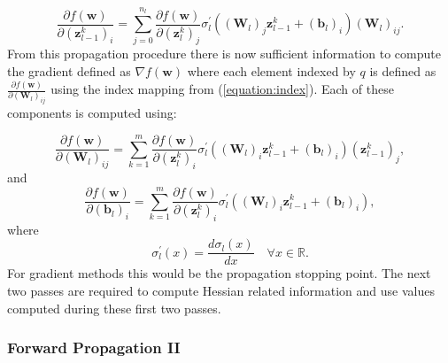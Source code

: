 \documentclass[letterpaper,12pt,titlepage,oneside,final]{book}
\begin{document}
	\begin{equation}
	\frac{\partial{f(\mathbf{w})}}{\partial{(\mathbf{z}_{l-1}^{k})_{i}}} = \sum_{j=0}^{n_{l}}{\frac{\partial{f(\mathbf{w})}}{\partial{(\mathbf{z}_{l}^{k})_{j}}}\sigma_{l}^{\prime}((\mathbf{W}_{l})_{j}\mathbf{z}_{l-1}^{k} + (\mathbf{b}_{l})_{i})(\mathbf{W}_{l})_{ij}}.
	\label{equation:pass2_pe}
	\end{equation}
	From this propagation procedure there is now sufficient information to compute the gradient defined as $\nabla{f(\mathbf{w})}$ where each element indexed by $q$ is defined as $\frac{\partial{f(\mathbf{w})}}{\partial{(\mathbf{W}_{l})_{ij}}}$ using the index mapping from (\ref{equation:index}). Each of these components is computed using:
	
	\begin{equation}
	\frac{\partial{f(\mathbf{w})}}{\partial{(\mathbf{W}_{l})_{ij}}} = \sum_{k=1}^{m}{\frac{\partial{f(\mathbf{w})}}{\partial{(\mathbf{z}_{l}^{k})_{i}}}\sigma_{l}^{\prime}((\mathbf{W}_{l})_{i}\mathbf{z}_{l-1}^{k}+ (\mathbf{b}_{l})_{i})(\mathbf{z}^{k}_{l-1})_{j}},
	\label{equation:grad_w}
	\end{equation}
	and
	\begin{equation}
	\frac{\partial{f(\mathbf{w})}}{\partial{(\mathbf{b}_{l})_{i}}} = \sum_{k=1}^{m}{\frac{\partial{f(\mathbf{w})}}{\partial{(\mathbf{z}_{l}^{k})_{i}}}\sigma_{l}^{\prime}((\mathbf{W}_{l})_{i}\mathbf{z}_{l-1}^{k}+ (\mathbf{b}_{l})_{i})},
	\label{equation:grad_b}
	\end{equation}
	where 
	\begin{equation}
	\sigma_{l}^{\prime}(x) = \frac{d\sigma_{l}(x)}{d x} \quad \forall x \in \mathbb{R}.
	\end{equation}
	For gradient methods this would be the propagation stopping point. The next two passes are required to compute Hessian related information and use values computed during these first two passes.
	
	
	\subsubsection{Forward Propagation II}
	
\end{document}
